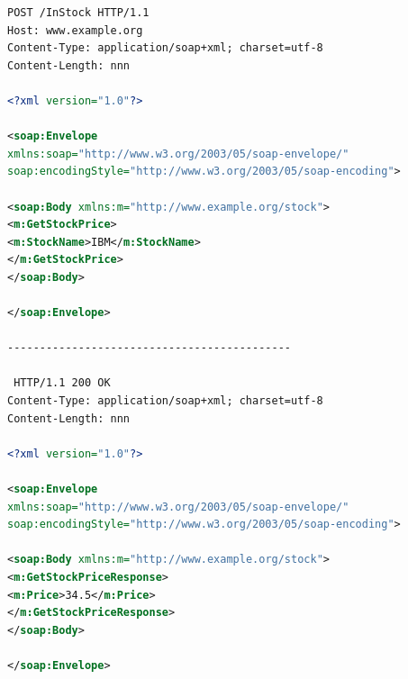 \documentclass[fleqn,10.5pt,ngerman]{SelfArx}
\begin{document}
\begin{lstlisting}[caption=Beispiel: SOAP-Request und SOAP-Response als Envelope, label=envelopesoap, language=xml]
 POST /InStock HTTP/1.1
Host: www.example.org
Content-Type: application/soap+xml; charset=utf-8
Content-Length: nnn

<?xml version="1.0"?>

<soap:Envelope
xmlns:soap="http://www.w3.org/2003/05/soap-envelope/"
soap:encodingStyle="http://www.w3.org/2003/05/soap-encoding">

<soap:Body xmlns:m="http://www.example.org/stock">
<m:GetStockPrice>
<m:StockName>IBM</m:StockName>
</m:GetStockPrice>
</soap:Body>

</soap:Envelope>

--------------------------------------------

 HTTP/1.1 200 OK
Content-Type: application/soap+xml; charset=utf-8
Content-Length: nnn

<?xml version="1.0"?>

<soap:Envelope
xmlns:soap="http://www.w3.org/2003/05/soap-envelope/"
soap:encodingStyle="http://www.w3.org/2003/05/soap-encoding">

<soap:Body xmlns:m="http://www.example.org/stock">
<m:GetStockPriceResponse>
<m:Price>34.5</m:Price>
</m:GetStockPriceResponse>
</soap:Body>

</soap:Envelope>
\end{lstlisting}
\end{document}
